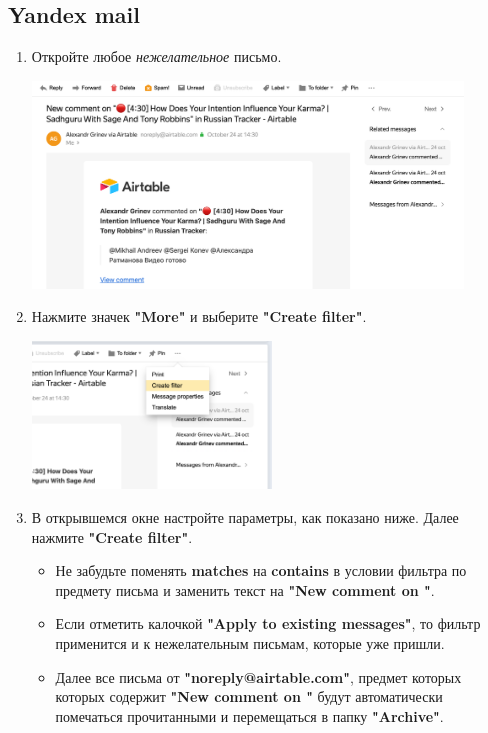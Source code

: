 \documentclass[
a4paper, %
12pt, %
article,
onecolumn, %
openany, %
]{memoir}
\begin{document}
\subsection{Yandex mail}
\begin{enumerate}
    \item Откройте любое \emph{нежелательное} письмо.
	    \begin{center} 
	        \includegraphics[width=0.9\textwidth]{AirTableSpam/ya0} 
	    \end{center}
    \item Нажмите значек \textbf{"More"} и выберите 
                \textbf{"Create filter"}.
	    \begin{center} 
	        \includegraphics[width=0.5\textwidth]{AirTableSpam/ya1} 
	    \end{center}
    \item В открывшемся окне настройте параметры, как показано ниже. 
        Далее нажмите \textbf{"Create filter"}.
        \begin{itemize}
            \item Не забудьте поменять \textbf{matches} на 
                \textbf{contains} в условии 
                фильтра по предмету письма и заменить текст на 
                \textbf{"New comment on "}.
            \item Если отметить калочкой \textbf{"Apply to existing messages"},
                то фильтр применится и к нежелательным письмам, которые 
                уже пришли.
            \item Далее все письма от \textbf{"noreply@airtable.com"}, предмет
                которых которых содержит \textbf{"New comment on "} 
                будут автоматически помечаться прочитанными 
                и перемещаться в папку \textbf{"Archive"}.
        \end{itemize}


\end{enumerate}
\end{document}
